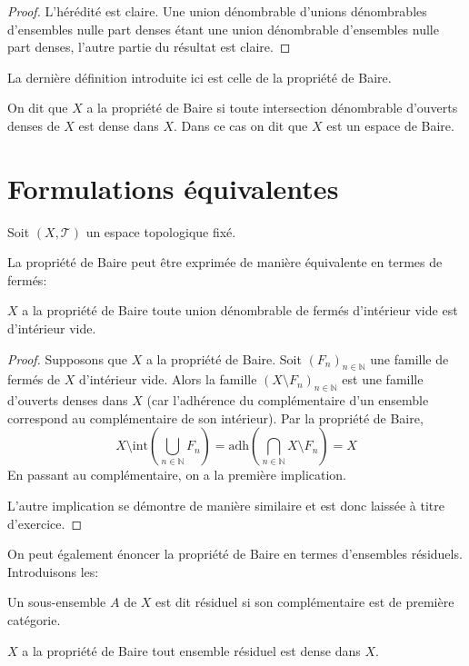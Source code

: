 \begin{proof}
  L'hérédité est claire. Une union dénombrable d'unions dénombrables d'ensembles
  nulle part denses étant une union dénombrable d'ensembles nulle part denses,
  l'autre partie du résultat est claire.
\end{proof}

La dernière définition introduite ici est celle de la propriété de Baire.
\begin{df}
  On dit que $X$ a la propriété de Baire si toute intersection dénombrable
  d'ouverts denses de $X$ est dense dans $X$. Dans ce cas on dit que $X$
  est un espace de Baire.
\end{df}

\section{Formulations équivalentes}
Soit $(X, \mathcal{T})$ un espace topologique fixé.
 
La propriété de Baire peut être exprimée de manière équivalente
en termes de fermés:
\begin{prop}
  $X$ a la propriété de Baire \ssi{} toute union dénombrable de fermés
  d'intérieur vide est d'intérieur vide.
\end{prop}

\begin{proof}
  Supposons que $X$ a la propriété de Baire. Soit $(F_n)_{n\in\mathbb{N}}$ une
  famille de fermés de $X$ d'intérieur vide. Alors la famille
  $(X\setminus F_n)_{n\in\mathbb{N}}$ est une famille d'ouverts denses dans $X$
  (car l'adhérence du complémentaire d'un ensemble correspond au complémentaire
  de son intérieur). Par la propriété de Baire,
  $$X\setminus\mathrm{int} \left(\bigcup_{n\in\mathbb{N}} F_n \right) 
  =\mathrm{adh}\left(\bigcap_{n\in\mathbb{N}} X\setminus F_n\right) = X$$
  En passant au complémentaire, on a la première implication.

  L'autre implication se démontre de manière similaire et est donc laissée
  à titre d'exercice.
\end{proof}

On peut également énoncer la propriété de Baire en termes d'ensembles
résiduels. Introduisons les:
\begin{df}
  Un sous-ensemble $A$ de $X$ est dit résiduel si son complémentaire
  est de première catégorie.
\end{df}

\begin{prop}
  $X$ a la propriété de Baire \ssi{}  tout
  ensemble résiduel est dense dans $X$.
\end{prop}

